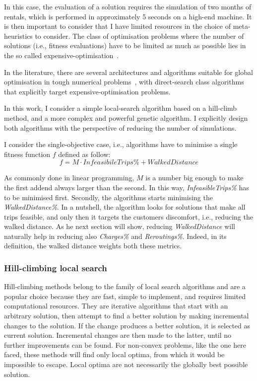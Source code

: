 In this case, the evaluation of a solution requires the simulation of two months of rentals, which is performed in approximately 5 seconds on a high-end machine. It is then important to consider that I have limited resources in the choice of meta-heuristics to consider. 
The class of optimisation problems where the number of solutions (i.e., fitness evaluations) have to be limited as much as possible lies in the so called expensive-optimisation~\cite{RA09,FP09}. 

In the literature, there are several architectures and algorithms suitable for global optimisation in tough numerical problems~\cite{FP09}, with direct-search class algorithms that explicitly target expensive-optimisation problems.

In this work, I consider a simple local-search algorithm based on a hill-climb method, and a more complex and powerful genetic algorithm. I explicitly design both algorithms with the perspective of reducing the number of simulations. 

I consider the single-objective case, i.e., algorithms have to minimise a single fitness function $f$ defined as follow:
 $$f = M \cdot InfeasibileTrips\% + WalkedDistance$$


As commonly done in linear programming, $M$ is a number big enough to make the first addend always larger than the second.
In this way, \textit{InfeasibleTrips\%} has to be minimised first. Secondly, the algorithms starts minimising the \textit{WalkedDistance\%}. In a nutshell, the algorithm looks for solutions that make all trips feasible, and only then it targets the customers discomfort, i.e., reducing the walked distance. 
As he next section will show, reducing \textit{WalkedDistance} will naturally help in reducing also \textit{Charges\%} and \textit{Reroutings\%}. Indeed, in its definition, the walked distance weights both these metrics.


\subsubsection{Hill-climbing local search}

Hill-climbing methods belong to the family of local search algorithms and are a popular choice because they are fast, simple to implement, and requires limited computational resources. They are iterative algorithms that start with an arbitrary solution, then attempt to find a better solution by making incremental changes to the solution. If the change produces a better solution, it is selected as current solution. Incremental changes are then made to the latter, until no further improvements can be found.
For non-convex problems, like the one here faced, these methods will find only local optima, from which it would be impossible to escape. Local optima are not necessarily the globally best possible solution.

